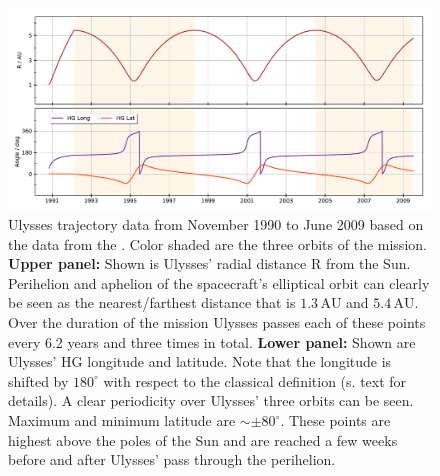 \begin{figure}[h]
	\includegraphics[width=1\textwidth]{Figures/HG_coord.pdf}
	\centering
	\caption{Ulysses trajectory data from November 1990 to June 2009 based on the data from the \citet{ulysses-data-archive}. Color shaded are the three orbits of the mission. \textbf{Upper panel:} Shown is Ulysses' radial distance R from the Sun. Perihelion and aphelion of the spacecraft's elliptical orbit can clearly be seen as the nearest/farthest distance that is $1.3\,\mathrm{AU}$ and $5.4\,\mathrm{AU}$. Over the duration of the mission Ulysses passes each of these points every 6.2 years and three times in total. \textbf{Lower panel:} Shown are Ulysses' HG longitude and latitude. Note that the longitude is shifted by $180^\circ$ with respect to the classical definition (s. text for details). A clear periodicity over Ulysses' three orbits can be seen. Maximum and minimum latitude are $\sim \pm 80^\circ$. These points are highest above the poles of the Sun and are reached a few weeks before and after Ulysses' pass through the perihelion.}
	\label{fig:traj}
\end{figure}

